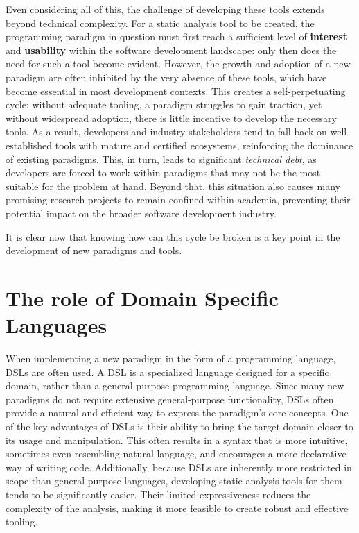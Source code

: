 \documentclass[12pt,a4paper,openright,twoside]{book}
\begin{document}
Even considering all of this, the challenge of developing these tools extends
beyond technical complexity. For a static analysis tool to be created, the
programming paradigm in question must first reach a sufficient level of
\textbf{interest} and \textbf{usability} within the software development
landscape: only then does the need for such a tool become evident. However, the
growth and adoption of a new paradigm are often inhibited by the very absence of
these tools, which have become essential in most development contexts. This
creates a self-perpetuating cycle: without adequate tooling, a paradigm
struggles to gain traction, yet without widespread adoption, there is little
incentive to develop the necessary tools.
%
As a result, developers and industry stakeholders tend to fall back on
well-established tools with mature and certified ecosystems, reinforcing the
dominance of existing paradigms. This, in turn, leads to significant
\emph{technical debt}, as developers are forced to work within paradigms that
may not be the most suitable for the problem at hand. Beyond that, this
situation also causes many promising research projects to remain confined within
academia, preventing their potential impact on the broader software development
industry. 

It is clear now that knowing how can this cycle be broken is a key point in 
the development of new paradigms and tools.

\section{The role of Domain Specific Languages}

When implementing a new paradigm in the form of a programming language,
\acp{DSL} are often used. A \ac{DSL} is a specialized language designed for a
specific domain, rather than a general-purpose programming language. Since many
new paradigms do not require extensive general-purpose functionality, \acp{DSL}
often provide a natural and efficient way to express the paradigm’s core
concepts.
%
One of the key advantages of \acp{DSL} is their ability to bring the target
domain closer to its usage and manipulation. This often results in a syntax that
is more intuitive, sometimes even resembling natural language, and encourages a
more declarative way of writing code. Additionally, because \acp{DSL} are
inherently more restricted in scope than general-purpose languages, developing
static analysis tools for them tends to be significantly easier. Their limited
expressiveness reduces the complexity of the analysis, making it more feasible
to create robust and effective tooling. 
\end{document}
